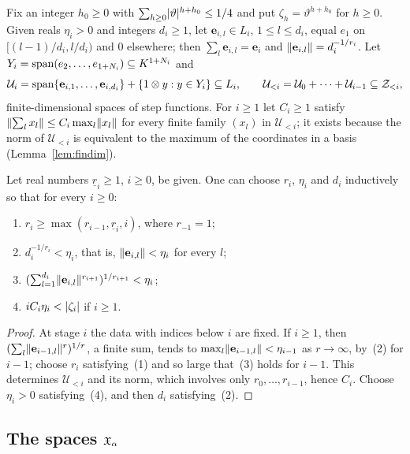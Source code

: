 Fix an integer $h_0\ge0$ with $\sum_{h\ge0}\lvert \vartheta\rvert^{h+h_0}\le1/4$ and put $\zeta_h=\vartheta^{h+h_0}$ for $h\ge0$.
Given reals $\eta_i>0$ and integers $d_i\ge1$, let $\mathbf e_{i,l}\in L_i$, $1\le l\le d_i$,
equal $e_1$ on $[(l-1)/d_i,l/d_i)$ and $0$ elsewhere; then $\sum_l\mathbf e_{i,l}=\mathbf e_i$ and
$\lVert \mathbf e_{i,l}\rVert=d_i^{-1/r_i}$. Let $Y_i=\operatorname{span}(e_2,\dots,e_{1+N_i})\subseteq K^{1+N_i}$ and
\[
 \mathcal U_i=\operatorname{span}\{\mathbf e_{i,1},\dots,\mathbf e_{i,d_i}\}+\{1\otimes y:y\in Y_i\}\subseteq L_i,\qquad
 \mathcal U_{<i}=\mathcal U_0+\dots+\mathcal U_{i-1}\subseteq\mathcal Z_{<i},
\]
finite-dimensional spaces of step functions. For $i\ge1$ let $C_i\ge1$ satisfy $\lVert \sum_lx_l\rVert\le C_i\max_l\lVert x_l\rVert$
for every finite family $(x_l)$ in $\mathcal U_{<i}$; it exists because the norm of $\mathcal U_{<i}$ is equivalent to
the maximum of the coordinates in a basis (Lemma~\ref{lem:findim}).

\begin{lemma}\label{rig:lem:choices}
Let real numbers $\underline r_i\ge1$, $i\ge0$, be given. One can choose $r_i$, $\eta_i$ and $d_i$ inductively so that
for every $i\ge0$:
\begin{enumerate}
\item $r_i\ge\max(r_{i-1},\underline r_i,i)$, where $r_{-1}=1$;
\item $d_i^{-1/r_i}<\eta_i$, that is, $\lVert \mathbf e_{i,l}\rVert<\eta_i$ for every $l$;
\item $(\sum_{l=1}^{d_i}\lVert \mathbf e_{i,l}\rVert^{r_{i+1}})^{1/r_{i+1}}<\eta_i$;
\item $iC_i\eta_i<\lvert \zeta_i\rvert$ if $i\ge1$.
\end{enumerate}
\end{lemma}

\begin{proof}
At stage $i$ the data with indices below $i$ are fixed. If $i\ge1$, then $(\sum_l\lVert \mathbf e_{i-1,l}\rVert^r)^{1/r}$, a
finite sum, tends to $\max_l\lVert \mathbf e_{i-1,l}\rVert<\eta_{i-1}$ as $r\to\infty$, by~(2) for $i-1$; choose $r_i$
satisfying~(1) and so large that~(3) holds for $i-1$. This determines $\mathcal U_{<i}$ and its norm, which involves
only $r_0,\dots,r_{i-1}$, hence $C_i$.
Choose $\eta_i>0$ satisfying~(4), and then $d_i$ satisfying~(2).
\end{proof}

\subsection{The spaces \texorpdfstring{$\mathfrak X_\alpha$}{X\_alpha}}\label{rig:ssec:spaces}

